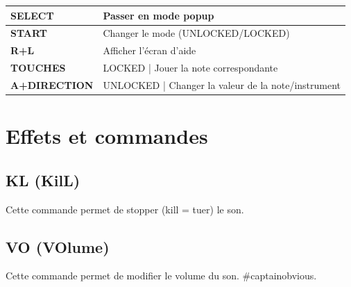 \documentclass[12pt,a4paper]{article}
\begin{document}
        \tablelasttail{\hline}
        \begin{supertabular}{|l|p{11cm}|}
        \hline
            {\bf SELECT} & Passer en mode popup \\
            \hline
            {\bf START} & Changer le mode (UNLOCKED/LOCKED) \\
            \hline
            {\bf R+L} & Afficher l'écran d'aide \\
            \hline
            {\bf TOUCHES} & LOCKED | Jouer la note correspondante \\
            \hline
            {\bf A+DIRECTION} & UNLOCKED | Changer la valeur de la note/instrument \\ 
        \hline
        \end{supertabular}
    
  \section{Effets et commandes}
  
  
  \subsection{KL (KilL)}
  
  Cette commande permet de stopper (kill = tuer) le son. 

  \subsection{VO (VOlume)}

  Cette commande permet de modifier le volume du son. \#captainobvious.

  
  
\end{document}
